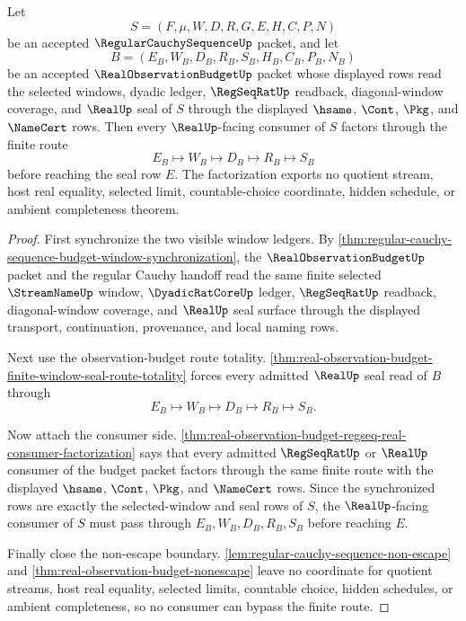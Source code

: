 \begin{theorem}
\label{thm:regular-cauchy-sequence-real-observation-budget-seal-factorization}
Let
$$
S=(F,\mu,W,D,R,G,E,H,C,P,N)
$$
be an accepted $\RegularCauchySequenceUp$ packet, and let
$$
B=(E_B,W_B,D_B,R_B,S_B,H_B,C_B,P_B,N_B)
$$
be an accepted $\RealObservationBudgetUp$ packet whose displayed rows read the selected windows, dyadic ledger, $\RegSeqRatUp$ readback, diagonal-window coverage, and $\RealUp$ seal of $S$ through the displayed $\hsame$, $\Cont$, $\Pkg$, and $\NameCert$ rows. Then every $\RealUp$-facing consumer of $S$ factors through the finite route
$$
E_B \longmapsto W_B \longmapsto D_B \longmapsto R_B \longmapsto S_B
$$
before reaching the seal row $E$. The factorization exports no quotient stream, host real equality, selected limit, countable-choice coordinate, hidden schedule, or ambient completeness theorem.
\end{theorem}
\begin{proof}
First synchronize the two visible window ledgers. By \autoref{thm:regular-cauchy-sequence-budget-window-synchronization}, the $\RealObservationBudgetUp$ packet and the regular Cauchy handoff read the same finite selected $\StreamNameUp$ window, $\DyadicRatCoreUp$ ledger, $\RegSeqRatUp$ readback, diagonal-window coverage, and $\RealUp$ seal surface through the displayed transport, continuation, provenance, and local naming rows.

Next use the observation-budget route totality. \autoref{thm:real-observation-budget-finite-window-seal-route-totality} forces every admitted $\RealUp$ seal read of $B$ through
$$
E_B \longmapsto W_B \longmapsto D_B \longmapsto R_B \longmapsto S_B.
$$

Now attach the consumer side. \autoref{thm:real-observation-budget-regseq-real-consumer-factorization} says that every admitted $\RegSeqRatUp$ or $\RealUp$ consumer of the budget packet factors through the same finite route with the displayed $\hsame$, $\Cont$, $\Pkg$, and $\NameCert$ rows. Since the synchronized rows are exactly the selected-window and seal rows of $S$, the $\RealUp$-facing consumer of $S$ must pass through $E_B,W_B,D_B,R_B,S_B$ before reaching $E$.

Finally close the non-escape boundary. \autoref{lem:regular-cauchy-sequence-non-escape} and \autoref{thm:real-observation-budget-nonescape} leave no coordinate for quotient streams, host real equality, selected limits, countable choice, hidden schedules, or ambient completeness, so no consumer can bypass the finite route.
\end{proof}

